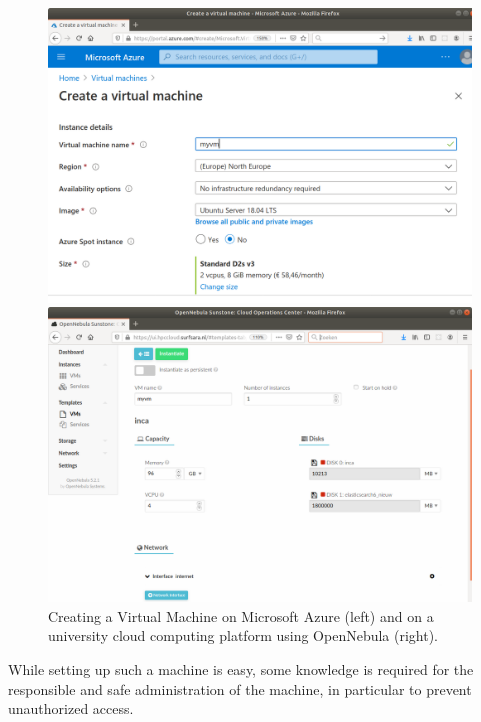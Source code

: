\begin{figure}[!tbp]
  \centering
  \begin{minipage}[b]{0.45\textwidth}
    \includegraphics[width=\textwidth]{figures/vmazure.png}
  \end{minipage}
  \hfill
  \begin{minipage}[b]{0.45\textwidth}
    \includegraphics[width=\textwidth]{figures/vmopennebula.png}
  \end{minipage}
  \caption{Creating a Virtual Machine on Microsoft Azure (left) and on a university cloud computing platform using OpenNebula (right).\label{fig:createvm}}
\end{figure}

While setting up such a machine is easy, some knowledge is required
for the responsible and safe administration of the machine, in
particular to prevent unauthorized access.

